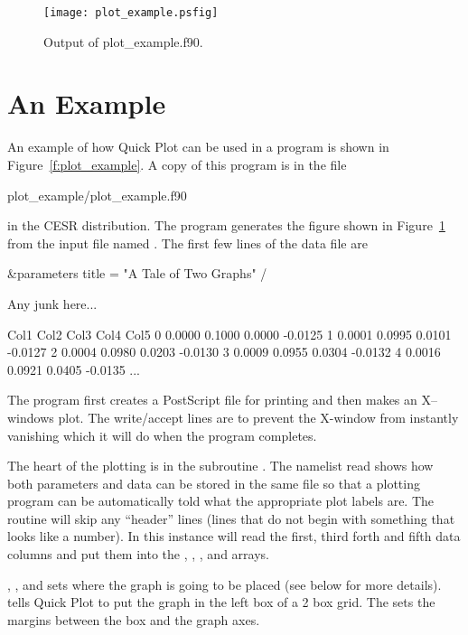 \begin{figure}
\centering
\texttt{[image: plot\_example.psfig]}
\caption{Output of plot\_example.f90.}
\label{f:plot_out}
\end{figure}

\section{An Example}
\label{s:plot_example}

An example of how Quick Plot can be used in a program is shown in 
Figure~\ref{f:plot_example}. A copy of this program is in the file
\begin{example}
  plot_example/plot_example.f90
\end{example}
in the CESR distribution. The  program generates
the figure shown in Figure~\ref{f:plot_out} from the input file named
. The first few lines of the data file are 
\begin{example}
 \&parameters
   title = "A Tale of Two Graphs"
 /
 
 Any junk here...
 
 Col1      Col2      Col3      Col4      Col5
    0    0.0000    0.1000    0.0000   -0.0125
    1    0.0001    0.0995    0.0101   -0.0127
    2    0.0004    0.0980    0.0203   -0.0130
    3    0.0009    0.0955    0.0304   -0.0132
    4    0.0016    0.0921    0.0405   -0.0135
    ...
\end{example}

The program first creates a PostScript file for printing and then makes an
X--windows plot. The write/accept lines are to prevent the X-window from
instantly vanishing which it will do when the program completes.

The heart of the plotting is in the subroutine . The namelist
read shows how both parameters and data can be stored in the same file
so that a plotting program can be automatically told what the appropriate
plot labels are. The  routine will skip any ``header'' lines
(lines that do not begin with something that looks
like a number). In this instance  will read the first, third
forth and fifth data columns and put them into the , , , 
and  arrays. 

, , and  sets where the 
graph is going to be placed (see below for more details). 
 tells Quick Plot to put the graph in the left box of
a 2 box grid. The  sets the margins
between the box and the graph axes. 

